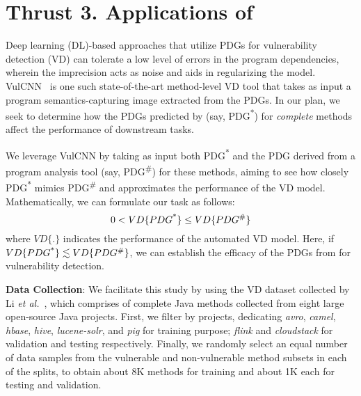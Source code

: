 \section{Thrust 3. Applications of {\tool}}
\label{sec:thrust3}




Deep learning (DL)-based approaches that utilize PDGs for
vulnerability detection (VD) can tolerate a low level of errors in the
program dependencies, wherein the imprecision acts as noise and aids
in regularizing the model. VulCNN~\cite{wu2022vulcnn} is one such
state-of-the-art method-level VD tool that takes as input a program
semantics-capturing image extracted from the PDGs. In our plan,
we seek to determine how the PDGs predicted by \tool (say,
PDG\textsuperscript{*}) for {\em complete} methods affect the
performance of downstream tasks.


We leverage VulCNN by taking as input both PDG\textsuperscript{*} and
the PDG derived from a program analysis tool (say,
PDG\textsuperscript{\#}) for these methods, aiming to see how closely
PDG\textsuperscript{*} mimics PDG\textsuperscript{\#} and approximates
the performance of the VD model. Mathematically, we can formulate our
task as follows:
\begin{equation}
    \centering
    0 < VD\{PDG\textsuperscript{*}\} \leq VD\{PDG\textsuperscript{\#}\}
\end{equation}
where $VD\{.\}$ indicates the performance of the automated VD model. Here, if $VD\{PDG\textsuperscript{*}\} \lesssim VD\{PDG\textsuperscript{\#}\}$, we can establish the efficacy of the PDGs from \tool for vulnerability detection.


{\bf Data Collection}: We facilitate this study by using the VD
dataset collected by Li {\em et al.}~\cite{yioopsla19}, which
comprises of
complete Java methods collected from eight large
open-source Java projects. First, we filter by projects, dedicating
\textit{avro}, \textit{camel}, \textit{hbase}, \textit{hive},
\textit{lucene-solr}, and \textit{pig} for training purpose;
\textit{flink} and \textit{cloudstack} for validation and testing
respectively.
Finally, we randomly select an equal number of data samples from the
vulnerable and non-vulnerable method subsets in each of the splits, to
obtain about 8K methods for training and about 1K each for testing and
validation.

